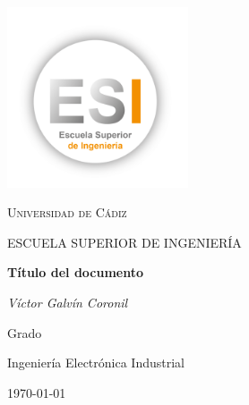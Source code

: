 \documentclass[spanish,11pt,a4paper]{article}
\title{}
\date{\today}
\author{Víctor Galvín Coronil}
\begin{document}
\begin{titlepage}
	\centering
	\includegraphics[width=0.40\textwidth]{logo-esi.png}\par\vspace{1cm}
	{\scshape\LARGE Universidad de Cádiz \par}
	\vspace{1cm}
	{\scshape\Large ESCUELA SUPERIOR DE INGENIERÍA\par}
	\vspace{1.5cm}
	{\Huge\bfseries Título del documento\par}
	\vspace{2cm}
	{\Large\itshape Víctor Galvín Coronil\par}
	\vfill
	Grado\par
	Ingeniería Electrónica Industrial
	\vfill
	
	{\large  \today \par}
\end{titlepage}
\end{document}
